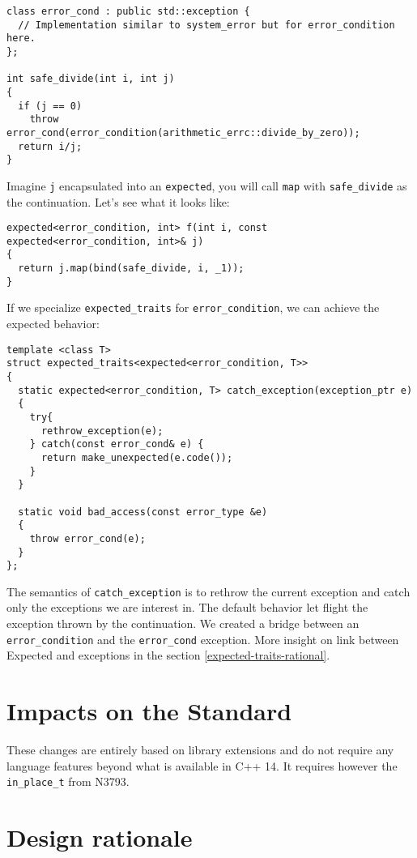 \documentclass[a4paper,10pt]{article}
\newcommand{\cpp}[1]{\lstinline{#1}}
\begin{document}
\begin{lstlisting}
class error_cond : public std::exception {
  // Implementation similar to system_error but for error_condition here.
};

int safe_divide(int i, int j)
{
  if (j == 0) 
    throw error_cond(error_condition(arithmetic_errc::divide_by_zero));
  return i/j;
}
\end{lstlisting}

Imagine \cpp{j} encapsulated into an \cpp{expected}, you will call \cpp{map} with \cpp{safe_divide} as the continuation. Let's see what it looks like:

\begin{lstlisting}
expected<error_condition, int> f(int i, const expected<error_condition, int>& j)
{
  return j.map(bind(safe_divide, i, _1));
}
\end{lstlisting}

If we specialize \cpp{expected_traits} for \cpp{error_condition}, we can achieve the expected behavior:

\begin{lstlisting}
template <class T>
struct expected_traits<expected<error_condition, T>>
{
  static expected<error_condition, T> catch_exception(exception_ptr e)
  {
    try{
      rethrow_exception(e);
    } catch(const error_cond& e) {
      return make_unexpected(e.code());
    }
  }

  static void bad_access(const error_type &e)
  {
    throw error_cond(e);
  }
};
\end{lstlisting}

The semantics of \cpp{catch_exception} is to rethrow the current exception and catch only the exceptions we are interest in. The default behavior let flight the exception thrown by the continuation. We created a bridge between an \cpp{error_condition} and the \cpp{error_cond} exception. More insight on link between Expected and exceptions in the section \ref{expected-traits-rational}.

\section{Impacts on the Standard}

These changes are entirely based on library extensions and do not require any language features beyond what is available in C++ 14. It requires however the \cpp{in_place_t} from N3793.

\section{Design rationale}
\end{document}

